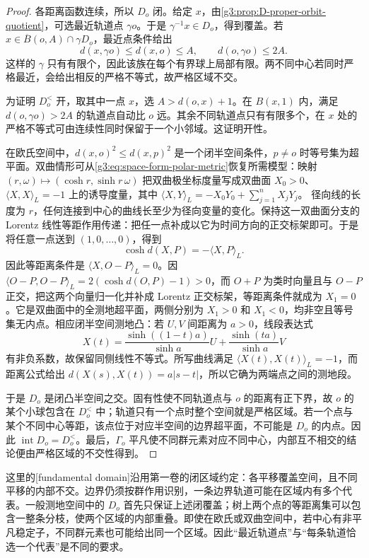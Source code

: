 \begin{proof}
	各距离函数连续，所以 \(D_o\) 闭。给定 \(x\)，由\cref{g3:prop:D-proper-orbit-quotient}，可选最近轨道点 \(\gamma o\)。于是 \(\gamma^{-1}x\in D_o\)，得到覆盖。若 \(x\in\overline B(o,A)\cap\gamma D_o\)，最近点条件给出
	\[
		d(x,\gamma o)\le d(x,o)\le A,\qquad
		d(o,\gamma o)\le2A.
	\]
	这样的 \(\gamma\) 只有有限个，因此该族在每个有界球上局部有限。两不同中心若同时严格最近，会给出相反的严格不等式，故严格区域不交。

	为证明 \(D_o^{<}\) 开，取其中一点 \(x\)，选 \(A>d(o,x)+1\)。在 \(B(x,1)\) 内，满足 \(d(o,\gamma o)>2A\) 的轨道点自动比 \(o\) 远。其余不同轨道点只有有限多个，在 \(x\) 处的严格不等式可由连续性同时保留于一个小邻域。这证明开性。

	在欧氏空间中，\(d(x,o)^2\le d(x,p)^2\) 是一个闭半空间条件，\(p\ne o\) 时等号集为超平面。双曲情形可从\eqref{g3:eq:space-form-polar-metric}恢复所需模型：映射
	\((r,\omega)\mapsto(\cosh r,\sinh r\,\omega)\)
	把双曲极坐标度量写成双曲面 \(X_0>0\)、\(\langle X,X\rangle_L=-1\) 上的诱导度量，其中
	\(\langle X,Y\rangle_L=-X_0Y_0+\sum_{j=1}^nX_jY_j\)。
	径向线的长度为 \(r\)，任何连接到中心的曲线长至少为径向变量的变化。保持这一双曲面分支的 Lorentz 线性等距作用传递：把任一点补成以它为时间方向的正交标架即可。于是将任意一点送到 \((1,0,\ldots,0)\)，得到
	\[
		\cosh d(X,P)=-\langle X,P\rangle_L.
	\]
	因此等距离条件是 \(\langle X,O-P\rangle_L=0\)。因
	\(\langle O-P,O-P\rangle_L=2(\cosh d(O,P)-1)>0\)，而 \(O+P\) 为类时向量且与 \(O-P\) 正交，把这两个向量归一化并补成 Lorentz 正交标架，等距离条件就成为 \(X_1=0\)。它是双曲面中的全测地超平面，两侧分别为 \(X_1>0\) 和 \(X_1<0\)，均非空且等号集无内点。相应闭半空间测地凸：若 \(U,V\) 间距离为 \(a>0\)，线段表达式
	\[
		X(t)=\frac{\sinh((1-t)a)}{\sinh a}U+
		\frac{\sinh(ta)}{\sinh a}V
	\]
	有非负系数，故保留同侧线性不等式。所写曲线满足 \(\langle X(t),X(t)\rangle_L=-1\)，而距离公式给出 \(d(X(s),X(t))=a|s-t|\)，所以它确为两端点之间的测地段。

	于是 \(D_o\) 是闭凸半空间之交。固有性使不同轨道点与 \(o\) 的距离有正下界，故 \(o\) 的某个小球包含在 \(D_o^{<}\) 中；轨道只有一个点时整个空间就是严格区域。若一个点与某个不同中心等距，该点位于对应半空间的边界超平面，不可能是 \(D_o\) 的内点。因此 \(\operatorname{int}D_o=D_o^{<}\)。最后，\(\Gamma_o\) 平凡使不同群元素对应不同中心，内部互不相交的结论便由严格区域的不交性得到。
\end{proof}

这里的[fundamental domain]沿用第一卷的闭区域约定：各平移覆盖空间，且不同平移的内部不交。边界仍须按群作用识别，一条边界轨道可能在区域内有多个代表。一般测地空间中的 \(D_o\) 首先只保证上述闭覆盖；树上两个点的等距离集可以包含一整条分枝，使两个区域的内部重叠。即使在欧氏或双曲空间中，若中心有非平凡稳定子，不同群元素也可能给出同一个区域。因此“最近轨道点”与“每条轨道恰选一个代表”是不同的要求。

